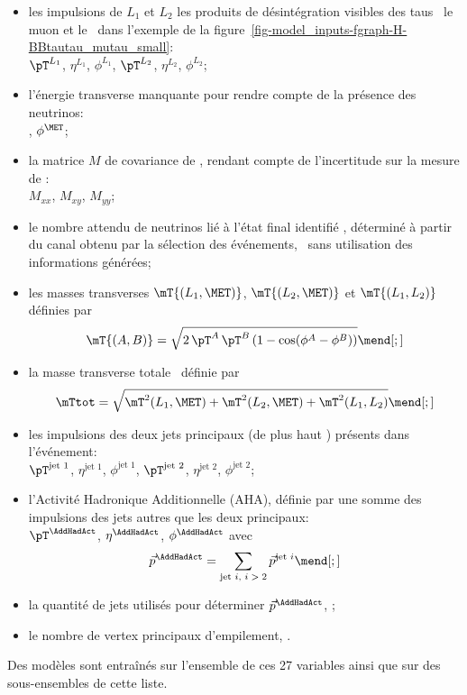 \begin{itemize}
\item les impulsions de $L_1$ et $L_2$ les produits de désintégration visibles des taus \ie\ le muon et le \tauh\ dans l'exemple de la figure~\ref{fig-model_inputs-fgraph-H-BBtautau_mutau_small}:\\
$\pT^{L_1}$, $\eta^{L_1}$, $\phi^{L_1}$,
$\pT^{L_2}$, $\eta^{L_2}$, $\phi^{L_2}$;
\item l'énergie transverse manquante pour rendre compte de la présence des neutrinos:\\
\MET, $\phi^{\MET}$;
\item la matrice $M$ de covariance de \MET, rendant compte de l'incertitude sur la mesure de \MET:\\
$M_{xx}$, $M_{xy}$, $M_{yy}$;
\item le nombre attendu de neutrinos lié à l'état final identifié \Nnu,
déterminé à partir du canal obtenu par la sélection des événements, \ie\ sans utilisation des informations générées;
\item les masses transverses
$\mT {(L_1,\MET)}$,
$\mT {(L_2,\MET)}$ et
$\mT {(L_1,L_2)}$
définies par
\begin{equation}
\mT {(A,B)} = \sqrt{2 \, \pT^{A} \, \pT^{B} \, (1-\cos(\phi^A-\phi^B))}
\mend[;]
\end{equation}
\item la masse transverse totale \mTtot\ définie par
\begin{equation}
\mTtot = \sqrt{\mT^2 {(L_1,\MET)} + \mT^2 {(L_2,\MET)} + \mT^2 {(L_1,L_2)}}
\mend[;]
\end{equation}
\item les impulsions des deux jets principaux (de plus haut \pT) présents dans l'événement:\\
$\pT^\text{jet 1}$, $\eta^\text{jet 1}$, $\phi^\text{jet 1}$,
$\pT^\text{jet 2}$, $\eta^\text{jet 2}$, $\phi^\text{jet 2}$;
\item l'Activité Hadronique Additionnelle (AHA), définie par une somme des impulsions des jets autres que les deux principaux:\\
$\pT^{\AddHadAct}$, $\eta^{\AddHadAct}$, $\phi^{\AddHadAct}$ avec
\begin{equation}
\vec{p}^{\AddHadAct} = \sum_\text{jet $i$, $i > 2$} \vec{p}^\text{jet $i$}
\mend[;]
\end{equation}
\item la quantité de jets utilisés pour déterminer $\vec{p}^{\AddHadAct}$, \Njetsr;
\item le nombre de vertex principaux d'empilement, \Npu.
\end{itemize}
Des modèles sont entraînés sur l'ensemble de ces 27 variables ainsi que sur des sous-ensembles de cette liste.